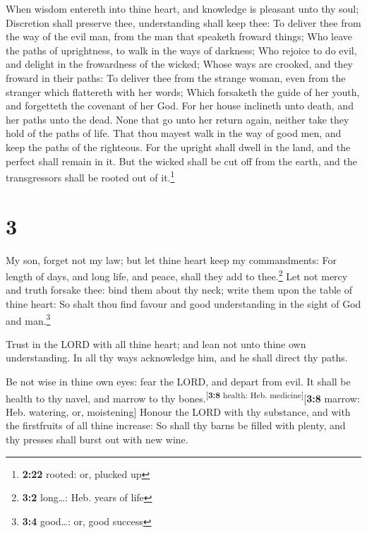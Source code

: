  When wisdom entereth into thine heart, and knowledge is
pleasant unto thy soul;  Discretion shall preserve thee,
understanding shall keep thee:  To deliver thee from the
way of the evil man, from the man that speaketh froward things;
 Who leave the paths of uprightness, to walk in the ways
of darkness;  Who rejoice to do evil, and delight in the
frowardness of the wicked;  Whose ways are crooked, and
they froward in their paths:  To deliver thee from the
strange woman, even from the stranger which flattereth with her words;
 Which forsaketh the guide of her youth, and forgetteth
the covenant of her God.  For her house inclineth unto
death, and her paths unto the dead.  None that go unto
her return again, neither take they hold of the paths of life.
 That thou mayest walk in the way of good men, and keep
the paths of the righteous.  For the upright shall dwell
in the land, and the perfect shall remain in it.  But the
wicked shall be cut off from the earth, and the transgressors shall be
rooted out of it.\footnote{\textbf{2:22} rooted: or, plucked up}

\hypertarget{section-2}{%
\section{3}\label{section-2}}

 My son, forget not my law; but let thine heart keep my
commandments:  For length of days, and long life, and
peace, shall they add to thee.\footnote{\textbf{3:2} long\ldots: Heb.
  years of life}  Let not mercy and truth forsake thee:
bind them about thy neck; write them upon the table of thine heart:
 So shalt thou find favour and good understanding in the
sight of God and man.\footnote{\textbf{3:4} good\ldots: or, good success}

 Trust in the LORD with all thine heart; and lean not unto
thine own understanding.  In all thy ways acknowledge him,
and he shall direct thy paths.

 Be not wise in thine own eyes: fear the LORD, and depart
from evil.  It shall be health to thy navel, and marrow to
thy bones.\textsuperscript{{[}\textbf{3:8} health: Heb.
medicine{]}}{[}\textbf{3:8} marrow: Heb. watering, or, moistening{]}
 Honour the LORD with thy substance, and with the
firstfruits of all thine increase:  So shall thy barns be
filled with plenty, and thy presses shall burst out with new wine.


